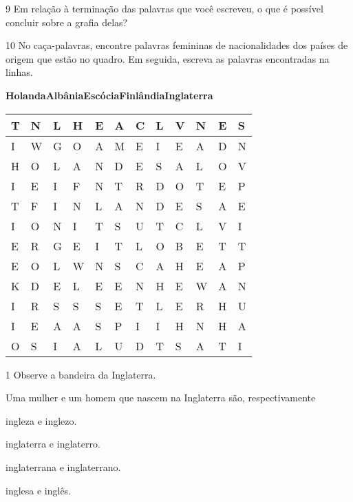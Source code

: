 \num{9} Em relação à terminação das palavras que você escreveu, o que é possível
concluir sobre a grafia delas?


\num{10} No caça-palavras, encontre palavras femininas de nacionalidades dos
países de origem que estão no quadro. Em seguida, escreva as palavras
encontradas na linhas.

\begin{mdframed}[linewidth=2pt,linecolor=salmao,roundcorner=20pt]
\textbf{Holanda}\hfill \textbf{Albânia}\hfill \textbf{Escócia}\hfill \textbf{Finlândia}\hfill \textbf{Inglaterra}
\end{mdframed}

\begin{longtable}[]{@{}llllllllllll@{}}
\toprule
T & N & L & H & E & A & C & L & V & N & E & S\tabularnewline
\midrule
\endhead
I & W & G & O & A & M & E & I & E & A & D & N\tabularnewline
H & O & L & A & N & D & E & S & A & L & O & V\tabularnewline
I & E & I & F & N & T & R & D & O & T & E & P\tabularnewline
T & F & I & N & L & A & N & D & E & S & A & E\tabularnewline
I & O & N & I & T & S & U & T & C & L & V & I\tabularnewline
E & R & G & E & I & T & L & O & B & E & T & T\tabularnewline
E & O & L & W & N & S & C & A & H & E & A & P\tabularnewline
K & D & E & L & E & E & N & H & E & W & A & N\tabularnewline
I & R & S & S & S & E & T & L & E & R & H & U\tabularnewline
I & E & A & A & S & P & I & I & H & N & H & A\tabularnewline
O & S & I & A & L & U & D & T & S & A & T & I\tabularnewline
\bottomrule
\end{longtable}



\num{1} Observe a bandeira da Inglaterra. %



Uma mulher e um homem que nascem na Inglaterra são, respectivamente

\begin{escolha}
\item ingleza e inglezo.

\item inglaterra e inglaterro.

\item inglaterrana e inglaterrano.

\item inglesa e inglês.
\end{escolha}


